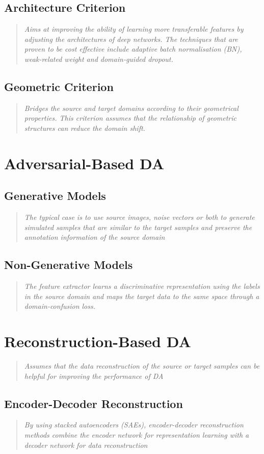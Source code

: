 \documentclass{report}
\newcommand{\quoteit}[1]{\begin{quote}\textit{#1}\end{quote}}
\begin{document}
\subsection{Architecture Criterion}
\quoteit{Aims at improving the ability of learning more transferable features by adjusting the architectures of deep networks. The techniques that are proven to be cost effective include adaptive batch normalisation (BN), weak-related weight and domain-guided dropout.}

\subsection{Geometric Criterion}
\quoteit{Bridges the source and target domains according to their geometrical properties. This criterion assumes that the relationship of geometric structures can reduce the domain shift.}



\section{Adversarial-Based DA}

\subsection{Generative Models}
\quoteit{The typical case is to use source images, noise vectors or both to generate simulated samples that are similar to the target samples and preserve the annotation information of the source domain}

\subsection{Non-Generative Models}
\quoteit{The feature extractor learns a discriminative representation using the labels in the source domain and maps the target data to the same space through a domain-confusion loss.}



\section{Reconstruction-Based DA}

\quoteit{Assumes that the data reconstruction of the source or target samples can be helpful for improving the performance of DA}

\subsection{Encoder-Decoder Reconstruction}
\quoteit{By using stacked autoencoders (SAEs), encoder-decoder reconstruction methods combine the encoder network for representation learning with a decoder network for data reconstruction}
\end{document}
